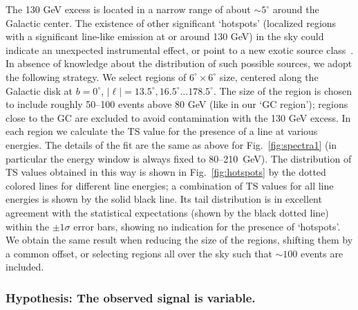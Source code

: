 \documentclass[aps,twocolumn,prd,superscriptaddress,showpacs,nofootinbib,fixfloat]{revtex4}
\begin{document}
The 130 GeV excess is located in a narrow range of about $\sim5^\circ$ around
the Galactic center. The existence of other significant `hotspots' (localized
regions with a significant line-like emission at or around 130 GeV) in the sky
could indicate an unexpected instrumental effect, or point to a new exotic
source class~\cite{Boyarsky:2012ca}. 
In absence of knowledge about the distribution of such possible
sources, we adopt the following strategy. We select regions of
$6^\circ\times6^\circ$ size, centered along the Galactic disk at
$b=0^\circ$, $|\ell|=13.5^\circ, 16.5^\circ \dots 178.5^\circ$. The size of
the region is chosen to include roughly 50--100 events above 80 GeV (like in our `GC
region'); regions close to the GC are excluded to avoid contamination with the
130 GeV excess. In each region we calculate the TS value for the presence of
a line at various energies. The details of the fit are the same as above for
Fig.~\ref{fig:spectra1} (in particular the energy window is always fixed to
80--210~GeV). The distribution of TS values obtained in this way is
shown in Fig.~\ref{fig:hotspots} by the dotted colored lines for different
line energies; a combination of
TS values for all line energies is shown by the solid black line. Its tail
distribution is in excellent agreement with the statistical expectations
(shown by the black dotted line) within the $\pm1\sigma$ error bars, showing
no indication for the presence of `hotspots'. We obtain the same 
result when reducing the size of the regions,
shifting them by a common offset, or selecting regions all over the
sky such that $\sim100$ events are included. 

\subsubsection{Hypothesis: The observed signal is variable.}
\end{document}
